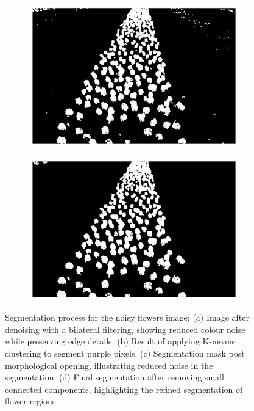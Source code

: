 \documentclass[11pt]{article}
\begin{document}
\begin{figure}[H]
\begin{subfigure}{.45\textwidth}
        \includegraphics[width=\linewidth]{figs/q1b_kmeans_mask_post_opening.png}
        \caption{}
        \label{fig:kmeans_mask_post_opening_flowers}
    \end{subfigure}%
    \begin{subfigure}{.45\textwidth}  %
        \centering
        \includegraphics[width=\linewidth]{figs/q1b_mask_post_cnc_removal.png}
        \caption{}
        \label{fig:cnc_threshold_flowers}
    \end{subfigure}%
    \caption{Segmentation process for the noisy flowers image: (a) Image after denoising with a bilateral filtering, showing reduced colour noise while preserving edge details. (b) Result of applying K-means clustering to segment purple pixels. (c) Segmentation mask post morphological opening, illustrating reduced noise in the segmentation. (d) Final segmentation after removing small connected components, highlighting the refined segmentation of flower regions.}
    \label{fig:q1b_segmentation_steps}
\end{figure}
\end{document}
